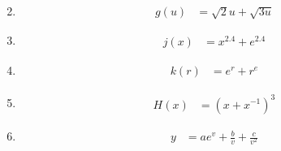 \documentclass{article}
\begin{document}
\begin{enumerate}
\begin{equation*}
    \end{equation*}
  \item 
    \begin{equation*}
      \begin{split}
        g(u) &= \sqrt{2}u+\sqrt{3u}
      \end{split}
    \end{equation*}
  \item 
    \begin{equation*}
      \begin{split}
        j(x) &= x^{2.4}+e^{2.4}
      \end{split}
    \end{equation*}
  \item 
    \begin{equation*}
      \begin{split}
        k(r) &= e^r+r^e
      \end{split}
    \end{equation*}
  \item
    \begin{equation*}
      \begin{split}
        H(x) &= (x+x^{-1})^3
      \end{split}
    \end{equation*}
  \item
    \begin{equation*}
      \begin{split}
        y &= ae^v+\frac{b}{v}+\frac{c}{v^2}
      \end{split}
    \end{equation*}
\end{enumerate}
\end{document}
